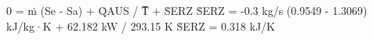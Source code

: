 0 = ṁ (Se - Sa) + Q̇AUS / T̅ + ṠERZ  
ṠERZ = -0.3 kg/s (0.9549 - 1.3069) kJ/kg·K + 62.182 kW / 293.15 K  
ṠERZ = 0.318 kJ/K